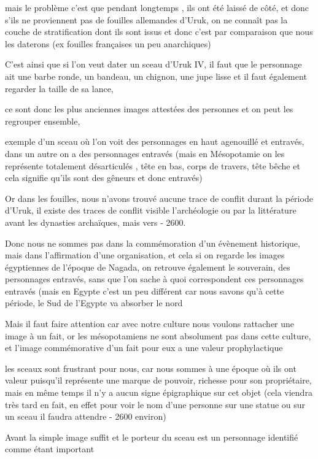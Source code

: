\documentclass[a4paper,10pt]{article}
\begin{document}
mais le problème c'est que pendant longtemps , ils ont
été laissé de côté, et donc s'ils ne proviennent pas
de fouilles allemandes d'Uruk, on ne connaît pas la
couche de stratification dont ils sont issus et donc
c'est par comparaison que nous les daterons (ex
fouilles françaises un peu anarchiques)

C'est ainsi que si l'on veut dater un
sceau d'Uruk IV, il faut que le personnage ait une
barbe ronde, un bandeau, un chignon, une jupe lisse et il faut
également regarder la taille de sa lance, 

ce sont donc les plus anciennes images attestées des personnes et on
peut les regrouper ensemble, 

exemple d'un sceau où  l'on voit des
personnages en haut agenouillé et entravés, dans un autre on a des
personnages entravés (mais en Mésopotamie on les représente totalement
désarticulés , tête en bas, corps de travers,  tête bêche et cela
signifie qu'ils sont des gêneurs et donc entravés)

Or dans les fouilles, nous n'avons trouvé aucune trace
de conflit durant la période d'Uruk, il existe des
traces de conflit visible l'archéologie ou par la
littérature avant les dynasties archaïques, mais vers - 2600.

\newline
Donc nous ne sommes pas dans la commémoration d'un
évènement historique, mais dans l'affirmation 
d'une organisation, et cela si on regarde les images
égyptiennes de l'époque de Nagada, on retrouve
également le souverain, des personnages entravés, sans que
l'on sache à quoi correspondent ces personnages
entravés (mais en Egypte c'est un peu différent car
nous savons qu'à cette période, le Sud de
l'Egypte va absorber le nord

Mais il faut faire attention car avec notre culture nous voulons
rattacher une image à un fait, or les mésopotamiens ne sont absolument
pas dans cette culture, et l'image commémorative
d'un fait pour eux a une valeur prophylactique

les sceaux sont frustrant pour nous, car nous sommes à une époque où ils
ont valeur puisqu'il représente une marque de pouvoir,
richesse pour son propriétaire, mais en même temps il
n'y a aucun signe épigraphique sur cet objet (cela
viendra très tard en fait, en effet pour voir le nom
d'une personne sur une statue ou sur un sceau il
faudra attendre - 2600 environ)

Avant la simple image suffit et le porteur du sceau est un personnage
identifié comme étant important
\end{document}
